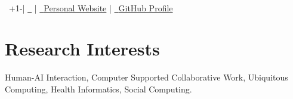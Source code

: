 \begin{center}
    \textbf{\Huge \name} \\
    \vspace{3mm}
 \raisebox{0.0\height}{\footnotesize \faPhone}\ +1-\phone  |
 \href{mailto:\emaila}{\raisebox{0.0\height}{\footnotesize \faEnvelope}\ {\emaila}}  |
 \href{\website}{\raisebox{0.0\height}{\footnotesize \faGlobe}\ {Personal Website}} |
 \href{https://eugeniayang.github.io/}{\raisebox{0.0\height}{\footnotesize \faGithub}\ {GitHub Profile}} 
\end{center}





\section{\textbf{Research Interests}}
\vspace{1mm}
\resumeItemListStart
\item{Human-AI Interaction, Computer Supported Collaborative Work, Ubiquitous Computing, Health Informatics, Social Computing.}
\resumeItemListEnd
\vspace{-3mm}